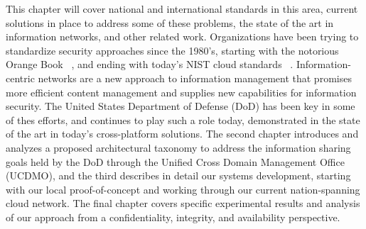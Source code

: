This chapter will cover national and international standards in this area, current solutions in place to address some of these problems, the state of the art in information networks, and other related work.  Organizations have been trying to standardize security approaches since the 1980's, starting with the notorious Orange Book ~\cite{OrangeBook}, and ending with today's NIST cloud standards ~\cite{NIST800:144}.  Information-centric networks are a new approach to information management that promises more efficient content  management and supplies new capabilities for information security. The United States Department of Defense (DoD) has been key in some of thes efforts, and continues to play such a role today, demonstrated in the state of the art in today's cross-platform solutions.  The second chapter introduces and analyzes a proposed architectural taxonomy to address the information sharing goals held by the DoD through the Unified Cross Domain Management Office (UCDMO), and the third describes in detail our systems development, starting with our local proof-of-concept and working through our current nation-spanning cloud network.  The final chapter covers specific experimental results and analysis of our approach from a confidentiality, integrity, and availability perspective.
